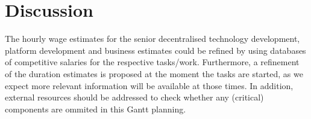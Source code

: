\section{Discussion}\label{sec:discussion}
The hourly wage estimates for the senior decentralised technology development, platform development and business estimates could be refined by using databases of competitive salaries for the respective tasks/work. Furthermore, a refinement of the duration estimates is proposed at the moment the tasks are started, as we expect more relevant information will be available at those times. In addition, external resources should be addressed to check whether any (critical) components are ommited in this Gantt planning.
